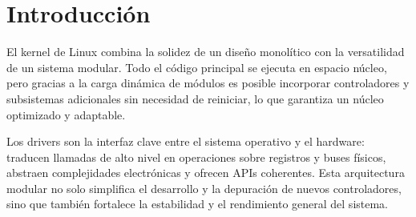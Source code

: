 \documentclass[a4paper,12pt]{article}
\begin{document}



\tableofcontents
\clearpage

\section{Introducción}
El kernel de Linux combina la solidez de un diseño monolítico con la versatilidad de un sistema modular. Todo el código principal se ejecuta en espacio núcleo, pero gracias a la carga dinámica de módulos es posible incorporar controladores y subsistemas adicionales sin necesidad de reiniciar, lo que garantiza un núcleo optimizado y adaptable.

Los drivers son la interfaz clave entre el sistema operativo y el hardware: traducen llamadas de alto nivel en operaciones sobre registros y buses físicos, abstraen complejidades electrónicas y ofrecen APIs coherentes. Esta arquitectura modular no solo simplifica el desarrollo y la depuración de nuevos controladores, sino que también fortalece la estabilidad y el rendimiento general del sistema.




\end{document}

